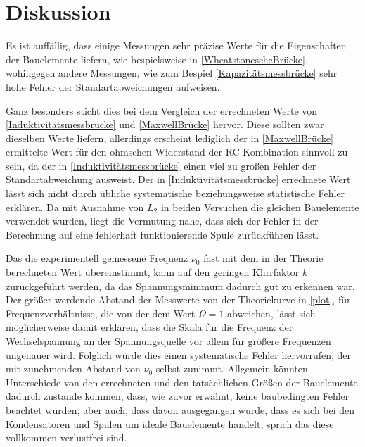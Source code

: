 \section{Diskussion}
\label{sec:Diskussion}

Es ist auffällig, dass einige Messungen sehr präzise Werte für die Eigenschaften der Bauelemente liefern, wie 
bespielsweise in \ref{WheatstonescheBrücke}, wohingegen andere Messungen, wie zum Bespiel \ref{Kapazitätsmessbrücke} sehr 
hohe Fehler der Standartabweichungen aufweisen.

Ganz besonders sticht dies bei dem Vergleich der errechneten Werte von \ref{Induktivitätsmessbrücke} und \ref{MaxwellBrücke} hervor.
Diese sollten zwar dieselben Werte liefern, allerdings erscheint lediglich der in \ref{MaxwellBrücke} ermittelte Wert für den 
ohmschen Widerstand der RC-Kombination sinnvoll zu sein, da der in \ref{Induktivitätsmessbrücke} einen viel zu großen Fehler der 
Standartabweichung ausweist. Der in \ref{Induktivitätsmessbrücke} errechnete Wert lässt sich nicht durch übliche systematische beziehungsweise
statistische Fehler erklären. Da mit Ausnahme von $L_{2}$ in beiden Versuchen die gleichen Bauelemente verwendet wurden, liegt 
die Vermutung nahe, dass sich der Fehler in der Berechnung auf eine fehlerhaft funktionierende Spule zurückführen lässt.

Das die experimentell gemessene Frequenz $\nu_{0}$ fast mit dem in der Theorie berechneten Wert übereinstimmt, kann auf den 
geringen Klirrfaktor $k$ zurückgeführt werden, da das Spannungsminimum dadurch gut zu erkennen war. Der größer werdende Abstand der Messwerte von der Theoriekurve in \ref{plot}, 
für Frequenzverhältnisse, die von der dem Wert $\Omega = 1$ abweichen, lässt sich möglicherweise damit erklären, dass die Skala für 
die Frequenz der Wechselspannung an der Spannungsquelle vor allem für größere Frequenzen ungenauer wird. Folglich würde dies einen 
systematische Fehler hervorrufen, der mit zunehmenden Abstand von $\nu_{0}$ selbst zunimmt.
Allgemein könnten Unterschiede von den errechneten und den tatsächlichen Größen der Bauelemente dadurch zustande kommen, dass, wie zuvor erwähnt,
keine baubedingten Fehler beachtet wurden, aber auch, dass davon ausgegangen wurde, dass es sich bei den Kondensatoren und Spulen um ideale 
Bauelemente handelt, sprich das diese vollkommen verlustfrei sind.
